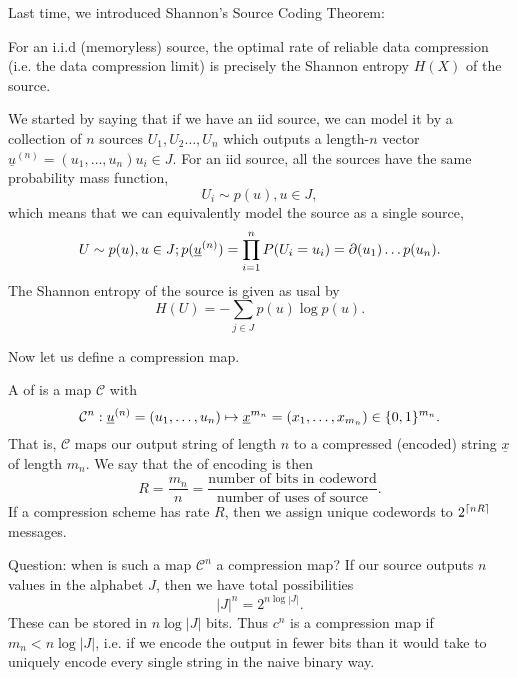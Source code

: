 Last time, we introduced Shannon's Source Coding Theorem:
\begin{thm}
    For an i.i.d (memoryless) source, the optimal rate of reliable data compression (i.e. the data compression limit) is precisely the Shannon entropy $H(X)$ of the source.
\end{thm}

We started by saying that if we have an iid source, we can model it by a collection of $n$ sources $U_1,U_2\ldots, U_n$ which outputs a length-$n$ vector $\underline{u}^{(n)}=(u_1,\ldots, u_n) u_i \in J$. For an iid source, all the sources have the same probability mass function,
\begin{equation*}
    U_i \sim p(u), u\in J,
\end{equation*}
which means that we can equivalently model the source as a single source,
\begin{equation*}
    U\sim p(u), u\in J; p(\underline{u}^{(n)}) =\prod_{i=1}^n P(U_i=u_i)= \partial(u_1)\ldots p(u_n).
\end{equation*}
The Shannon entropy of the source is given as usal by
\begin{equation}
    H(U)=-\sum_{j\in J} p(u)\log p(u).
\end{equation}

Now let us define a compression map.
\begin{defn}
    A  of  is a map $\mathcal C$ with
    \begin{equation}
        \mathcal{C}^n : \underline{u}^{(n)}=(u_1,\ldots, u_n) \mapsto \underline{x}^{m_n}=(x_1,\ldots, x_{m_n}) \in \{0,1\}^{m_n}.
    \end{equation}
    That is, $\mathcal{C}$ maps our output string of length $n$ to a compressed (encoded) string $\underline x$ of length $m_n$. We say that the  of encoding is then
    \begin{equation}
        R=\frac{m_n}{n}=\frac{\text{number of bits in codeword}}{\text{number of uses of source}}.
    \end{equation}
    If a compression scheme has rate $R$, then we assign unique codewords to $2^{\lceil nR\rceil}$ messages.
\end{defn}

Question: when is such a map $\mathcal{C}^n$ a compression map? If our source outputs $n$ values in the alphabet $J$, then we have total possibilities
\begin{equation}
    |J|^n=2^{n\log |J|}.
\end{equation}
These can be stored in $n\log |J|$ bits. Thus $c^n$ is a compression map if $m_n < n\log |J|$, i.e. if we encode the output in fewer bits than it would take to uniquely encode every single string in the naive binary way.

